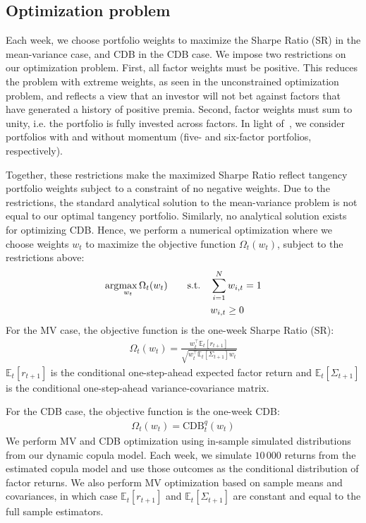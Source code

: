
\subsection{Optimization problem} %
\label{sub:optimization_problem}

Each week, we choose portfolio weights to maximize the Sharpe Ratio (SR) in the mean-variance case, and CDB in the CDB case. We impose two restrictions on our optimization problem. First, all factor weights must be positive. This reduces the problem with extreme weights, as seen in the unconstrained optimization problem, and reflects a view that an investor will not bet against factors that have generated a history of positive premia. Second, factor weights must sum to unity, i.e. the portfolio is fully invested across factors. In light of~\textcite{Asness2015}, we consider portfolios with and without momentum (five- and six-factor portfolios, respectively).

Together, these restrictions make the maximized Sharpe Ratio reflect tangency portfolio weights subject to a constraint of no negative weights. Due to the restrictions, the standard analytical solution to the mean-variance problem is not equal to our optimal tangency portfolio. Similarly, no analytical solution exists for optimizing CDB. Hence, we perform a numerical optimization where we choose weights $w_t$ to maximize the objective function $\Omega_t(w_t)$, subject to the restrictions above:
\begin{align}
  \arg\!\max_{w_t} \Omega_t(w_t)
    &&\text{\quad s.t.\quad} & \sum_{i=1}^N w_{i,t} = 1 \\
    &&                       & w_{i,t} \ge 0 \notag
\end{align}
For the MV case, the objective function is the one-week Sharpe Ratio (SR):
\begin{align}
  \Omega_t(w_t) = \frac{w_t^\top \mathbb{E}_t[r_{t+1}]}{\sqrt{w_t^\top \mathbb{E}_t[\Sigma_{t+1}] w_t}}
\end{align}
$\mathbb{E}_t[r_{t+1}]$ is the conditional one-step-ahead expected factor return and $\mathbb{E}_t[\Sigma_{t+1}]$ is the conditional one-step-ahead variance-covariance matrix. 

For the CDB case, the objective function is the one-week CDB:
\begin{align}
  \Omega_t(w_t) = \text{CDB}_t^q(w_t)
\end{align}
We perform MV and CDB optimization using in-sample simulated distributions from our dynamic copula model. Each week, we simulate $10\,000$ returns from the estimated copula model and use those outcomes as the conditional distribution of factor returns. We also perform MV optimization based on sample means and covariances, in which case $\mathbb{E}_t[r_{t+1}]$ and $\mathbb{E}_t[\Sigma_{t+1}]$ are constant and equal to the full sample estimators.


